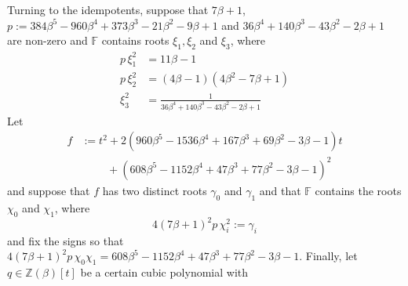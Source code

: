 \documentclass[11pt, a4paper]{article}
\theoremstyle{plain}
\theoremstyle{definition}
\newcommand\bt{\beta}
\newcommand\gm{\gamma}
\newcommand\Z{\mathbb{Z}}
\newcommand\FF{\mathbb{F}}
\newcommand{\0}{\overline{0}}
\newcommand{\2}{\overline{2}}
\newcommand{\1}{\mathbbm{1}}
\newcommand{\rt}{\xi}
\begin{document}
Turning to the idempotents, suppose that $7\bt+1$, $p := 384 \bt^5 - 960 \bt^4 + 373 \bt^3 - 21 \bt^2 - 9 \bt + 1$ and $36 \bt^4 + 140 \bt^3 - 43 \bt^2 - 2 \bt + 1$ are non-zero and $\FF$ contains roots $\rt_1, \rt_2$ and $\rt_3$, where
\begin{align*}
p\, \rt_1^2 &= 11\bt-1 \\
p\, \rt_2^2 &= (4\bt-1)(4\bt^2-7\bt+1) \\
\rt_3^2 &= \tfrac{1}{36 \bt^4 + 140 \bt^3 - 43 \bt^2 - 2 \bt + 1}
\end{align*}
Let
\begin{align*}
f &:= t^2 + 2(960\bt^5 - 1536\bt^4 + 167\bt^3 + 69\bt^2 - 3\bt - 1)t \\
&\phantom{{}={}} \quad + (608\bt^5 - 1152\bt^4 + 47\bt^3 + 77\bt^2 - 3\bt - 1)^2
\end{align*}
and suppose that $f$ has two distinct roots $\gm_0$ and $\gm_1$ and that $\FF$ contains the roots $\chi_0$ and $\chi_1$, where
\[
4(7\bt+1)^2 p \, \chi_i^2 := \gm_i
\]
and fix the signs so that $4(7\bt+1)^2 p\,  \chi_0 \chi_1 = 608\bt^5 - 1152\bt^4 + 47\bt^3 + 77\bt^2 - 3\bt - 1$.  Finally, let $q \in \Z(\bt)[t]$ be a certain cubic polynomial with
\end{document}
